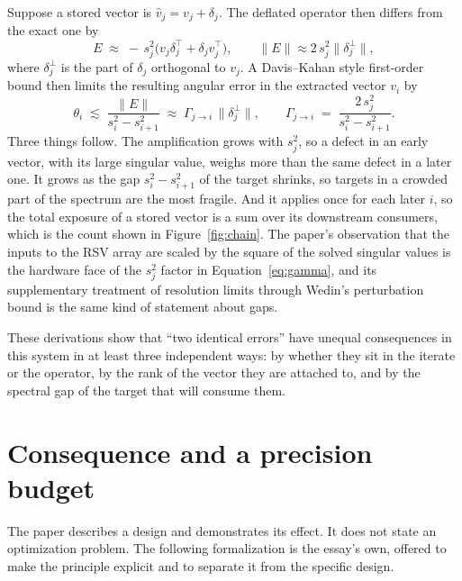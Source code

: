 \documentclass[11pt]{article}
\theoremstyle{definition}
\theoremstyle{remark}
\newcommand{\norm}[1]{\lVert #1\rVert}
\begin{document}
Suppose a stored vector is $\hat v_j=v_j+\delta_j$. The deflated operator then differs from the exact one by
\[
  E \;\approx\; -\,s_j^{2}\big(v_j\delta_j^{\top}+\delta_j v_j^{\top}\big),
  \qquad \norm{E}\approx 2\,s_j^{2}\norm{\delta_j^{\perp}},
\]
where $\delta_j^{\perp}$ is the part of $\delta_j$ orthogonal to $v_j$. A Davis--Kahan style first-order bound then limits the resulting angular error in the extracted vector $v_i$ by
\begin{equation}
  \theta_i \;\lesssim\; \frac{\norm{E}}{s_i^{2}-s_{i+1}^{2}}
  \;\approx\; \Gamma_{j\to i}\,\norm{\delta_j^{\perp}},
  \qquad
  \Gamma_{j\to i} \;=\; \frac{2\,s_j^{2}}{s_i^{2}-s_{i+1}^{2}}.
  \label{eq:gamma}
\end{equation}
Three things follow. The amplification grows with $s_j^2$, so a defect in an early vector, with its large singular value, weighs more than the same defect in a later one. It grows as the gap $s_i^2-s_{i+1}^2$ of the target shrinks, so targets in a crowded part of the spectrum are the most fragile. And it applies once for each later $i$, so the total exposure of a stored vector is a sum over its downstream consumers, which is the count shown in Figure~\ref{fig:chain}. The paper's observation that the inputs to the RSV array are scaled by the square of the solved singular values is the hardware face of the $s_j^2$ factor in Equation~\eqref{eq:gamma}, and its supplementary treatment of resolution limits through Wedin's perturbation bound is the same kind of statement about gaps.

These derivations show that ``two identical errors'' have unequal consequences in this system in at least three independent ways: by whether they sit in the iterate or the operator, by the rank of the vector they are attached to, and by the spectral gap of the target that will consume them.

\section{Consequence and a precision budget}

The paper describes a design and demonstrates its effect. It does not state an optimization problem. The following formalization is the essay's own, offered to make the principle explicit and to separate it from the specific design.
\end{document}
